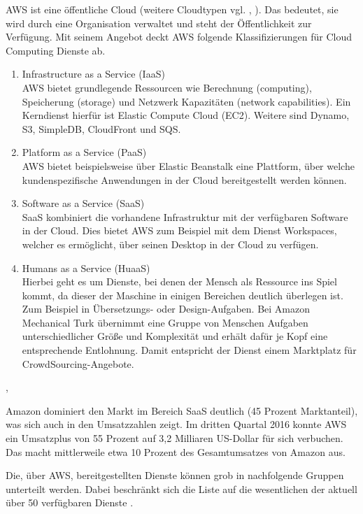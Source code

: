 {AWS ist eine öffentliche Cloud (weitere Cloudtypen vgl. \cite{wittig:awsinaction}, \cite{baun:cloudcomp}). Das bedeutet, sie wird durch eine Organisation verwaltet und steht der Öffentlichkeit zur Verfügung. Mit seinem Angebot deckt AWS folgende Klassifizierungen für Cloud Computing Dienste ab.
\begin{enumerate}
  \item Infrastructure as a Service (IaaS)
  \\AWS bietet grundlegende Ressourcen wie Berechnung (computing), Speicherung (storage) und Netzwerk Kapazitäten (network capabilities). Ein Kerndienst hierfür ist Elastic Compute Cloud (EC2). Weitere sind Dynamo, S3, SimpleDB, CloudFront und SQS.
  \item Platform as a Service (PaaS)
  \\AWS bietet beispielsweise über Elastic Beanstalk eine Plattform, über welche kundenspezifische Anwendungen in der Cloud bereitgestellt werden können.
  \item Software as a Service (SaaS)
  \\SaaS kombiniert die vorhandene Infrastruktur mit der verfügbaren Software in der Cloud. Dies bietet AWS zum Beispiel mit dem Dienst Workspaces, welcher es ermöglicht, über seinen Desktop in der Cloud zu verfügen.
  \item Humans as a Service (HuaaS)
  \\ Hierbei geht es um Dienste, bei denen der Mensch als Ressource ins Spiel kommt, da dieser der Maschine in einigen Bereichen deutlich überlegen ist. Zum Beispiel in Übersetzungs- oder Design-Aufgaben. Bei Amazon Mechanical Turk übernimmt eine Gruppe von Menschen Aufgaben unterschiedlicher Größe und Komplexität und erhält dafür je Kopf eine entsprechende Entlohnung. Damit entspricht der Dienst einem Marktplatz für CrowdSourcing-Angebote.
\end{enumerate} \cite{wittig:awsinaction}, \cite{baun:cloudcomp}

Amazon dominiert den Markt im Bereich SaaS deutlich (45 Prozent Marktanteil), was sich auch in den Umsatzzahlen zeigt. Im dritten Quartal 2016 konnte AWS ein Umsatzplus von 55 Prozent auf 3,2 Milliaren US-Dollar für sich verbuchen. Das macht mittlerweile etwa 10 Prozent des Gesamtumsatzes von Amazon aus. \cite{t3n:brien}

Die, über AWS, bereitgestellten Dienste können grob in nachfolgende Gruppen unterteilt werden. Dabei beschränkt sich die Liste auf die wesentlichen der aktuell über 50 verfügbaren Dienste \cite{sendcheckit:plain}.

}
